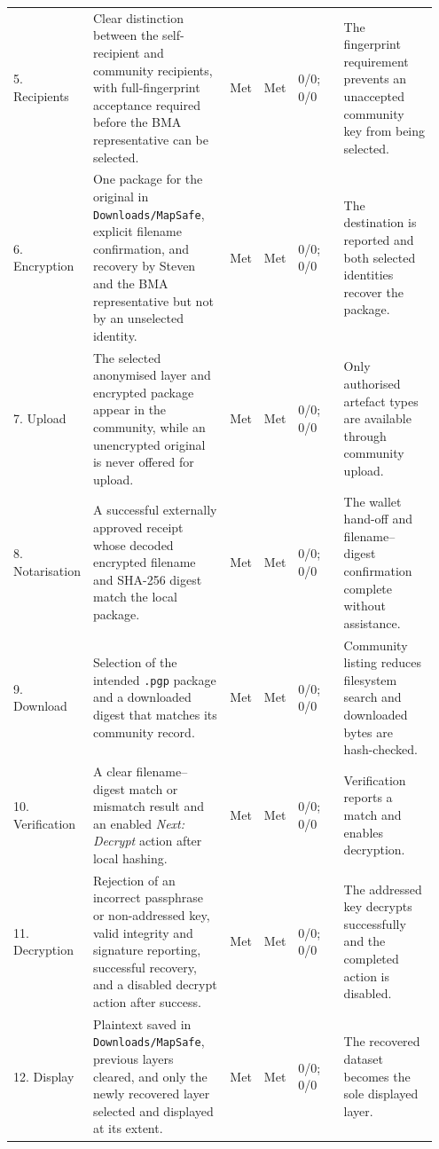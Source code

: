 \documentclass[]{interact}
\begin{document}
{\begin{longtable}{@{}p{0.095\linewidth}p{0.355\linewidth}p{0.06\linewidth}p{0.06\linewidth}p{0.13\linewidth}p{0.25\linewidth}@{}}
5. Recipients & Clear distinction between the self-recipient and community recipients, with full-fingerprint acceptance required before the BMA representative can be selected. & Met & Met & 0/0; 0/0 & The fingerprint requirement prevents an unaccepted community key from being selected. \\
6. Encryption & One package for the original in \texttt{Downloads/MapSafe}, explicit filename confirmation, and recovery by Steven and the BMA representative but not by an unselected identity. & Met & Met & 0/0; 0/0 & The destination is reported and both selected identities recover the package. \\
7. Upload & The selected anonymised layer and encrypted package appear in the community, while an unencrypted original is never offered for upload. & Met & Met & 0/0; 0/0 & Only authorised artefact types are available through community upload. \\
8. Notarisation & A successful externally approved receipt whose decoded encrypted filename and SHA-256 digest match the local package. & Met & Met & 0/0; 0/0 & The wallet hand-off and filename--digest confirmation complete without assistance. \\
9. Download & Selection of the intended \texttt{.pgp} package and a downloaded digest that matches its community record. & Met & Met & 0/0; 0/0 & Community listing reduces filesystem search and downloaded bytes are hash-checked. \\
10. Verification & A clear filename--digest match or mismatch result and an enabled \emph{Next: Decrypt} action after local hashing. & Met & Met & 0/0; 0/0 & Verification reports a match and enables decryption. \\
11. Decryption & Rejection of an incorrect passphrase or non-addressed key, valid integrity and signature reporting, successful recovery, and a disabled decrypt action after success. & Met & Met & 0/0; 0/0 & The addressed key decrypts successfully and the completed action is disabled. \\
12. Display & Plaintext saved in \texttt{Downloads/MapSafe}, previous layers cleared, and only the newly recovered layer selected and displayed at its extent. & Met & Met & 0/0; 0/0 & The recovered dataset becomes the sole displayed layer. \\
\end{longtable}
}

\clearpage

\end{document}
